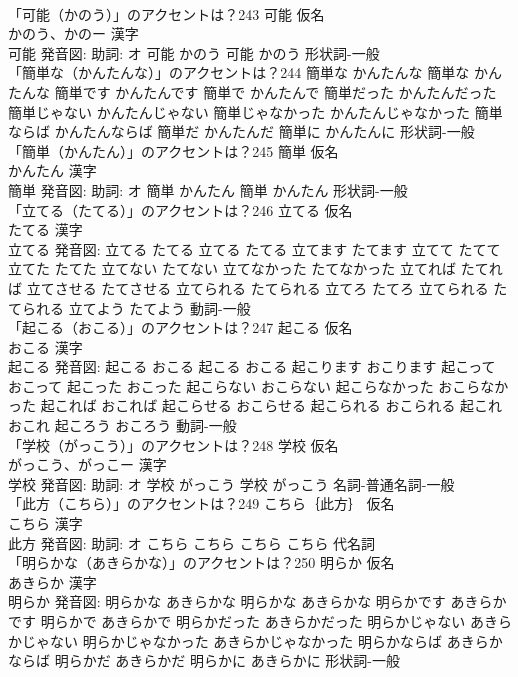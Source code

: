\documentclass[8pt]{extreport}
\begin{document}
\begin{CJK}{UTF8}{min}
\\	「可能（かのう）」のアクセントは？243	可能 仮名　
\\	かのう、かのー 漢字　
\\	可能 発音図: 助詞: オ	可能 かのう		可能 かのう				形状詞-一般 
\\	「簡単な（かんたんな）」のアクセントは？244		簡単な かんたんな		簡単な かんたんな 簡単です かんたんです 簡単で かんたんで 簡単だった かんたんだった 簡単じゃない かんたんじゃない 簡単じゃなかった かんたんじゃなかった 簡単ならば かんたんならば 簡単だ かんたんだ 簡単に かんたんに				形状詞-一般 
\\	「簡単（かんたん）」のアクセントは？245	簡単 仮名　
\\	かんたん 漢字　
\\	簡単 発音図: 助詞: オ	簡単 かんたん		簡単 かんたん				形状詞-一般 
\\	「立てる（たてる）」のアクセントは？246	立てる 仮名　
\\	たてる 漢字　
\\	立てる 発音図:	立てる たてる		立てる たてる 立てます たてます 立てて たてて 立てた たてた 立てない たてない 立てなかった たてなかった 立てれば たてれば 立てさせる たてさせる 立てられる たてられる 立てろ たてろ 立てられる たてられる 立てよう たてよう				動詞-一般 
\\	「起こる（おこる）」のアクセントは？247	起こる 仮名　
\\	おこる 漢字　
\\	起こる 発音図:	起こる おこる		起こる おこる 起こります おこります 起こって おこって 起こった おこった 起こらない おこらない 起こらなかった おこらなかった 起これば おこれば 起こらせる おこらせる 起こられる おこられる 起これ おこれ 起ころう おころう				動詞-一般 
\\	「学校（がっこう）」のアクセントは？248	学校 仮名　
\\	がっこう、がっこー 漢字　
\\	学校 発音図: 助詞: オ	学校 がっこう		学校 がっこう				名詞-普通名詞-一般 
\\	「此方（こちら）」のアクセントは？249	こちら｛此方｝ 仮名　
\\	こちら 漢字　
\\	此方 発音図: 助詞: オ	こちら こちら		こちら こちら				代名詞 
\\	「明らかな（あきらかな）」のアクセントは？250	明らか 仮名　
\\	あきらか 漢字　
\\	明らか 発音図:	明らかな あきらかな		明らかな あきらかな 明らかです あきらかです 明らかで あきらかで 明らかだった あきらかだった 明らかじゃない あきらかじゃない 明らかじゃなかった あきらかじゃなかった 明らかならば あきらかならば 明らかだ あきらかだ 明らかに あきらかに				形状詞-一般 

\end{CJK}
\end{document}
